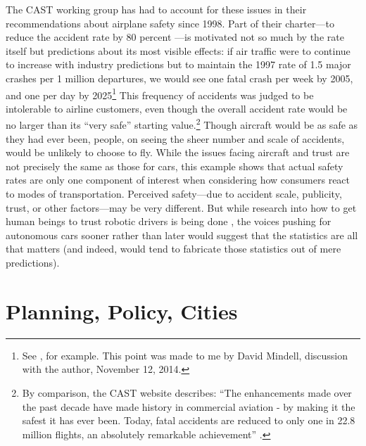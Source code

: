 The CAST working group has had to account for these issues in their
recommendations about airplane safety since 1998. Part of their charter---to
reduce the accident rate by 80 percent \cite[p. 28]{PARCCAST}---is
motivated not so much by the rate itself but predictions about its
most visible effects:  if air traffic were to continue to increase
with industry predictions but to maintain the 1997 rate of 1.5 major
crashes per 1 million departures, we would see one fatal crash per
week by 2005, and one per day by 2025\footnote{See
  \cite{predictmorecrashes},
  for example. This point was made to me by David Mindell, discussion
  with the author, November 12, 2014.}
This frequency of accidents was judged to be intolerable to
airline customers, even though the overall accident rate would be no
larger than its ``very safe'' \cite[p. 129]{PARCCAST} starting
value.\footnote{By comparison, the CAST website describes: ``The
  enhancements made over the past decade have made history in
  commercial aviation - by making it the safest it has ever been.
  Today, fatal accidents are reduced to only one in 22.8 million
  flights, an absolutely remarkable achievement'' \cite{cast-safety.org}.} Though
aircraft would be as safe as they 
had ever been, people, on seeing the sheer number and scale of
accidents, would be unlikely to choose to fly. While the issues facing
aircraft and trust are not precisely the same as those for cars, this
example shows that actual safety rates are only
one component of interest when considering how consumers react to
modes of transportation. Perceived safety---due to accident scale,
publicity, trust, or other factors---may be very different. But
while research into how to get human beings to trust robotic drivers
is being done \cite{rossTrust}, the voices pushing for autonomous cars sooner
rather than later would suggest that the statistics are all that
matters (and indeed, would tend to fabricate those statistics out of
mere predictions). 


\section{Planning, Policy, Cities}

